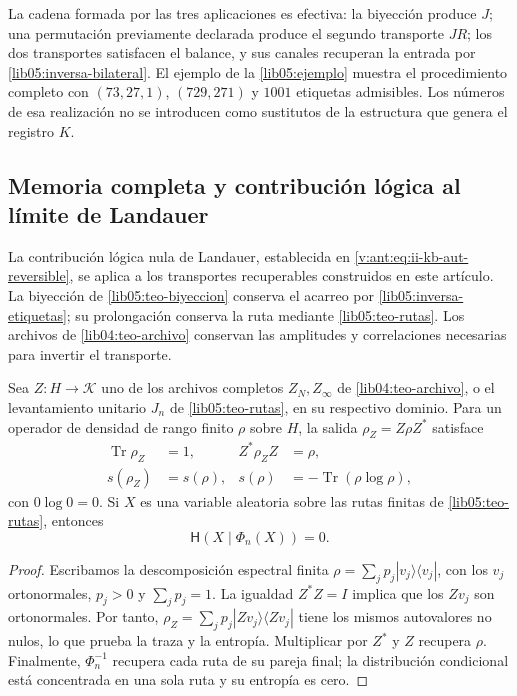 La cadena formada por las tres aplicaciones es efectiva: la biyección
produce \(J\); una permutación previamente declarada produce el
segundo transporte \(JR\); los dos transportes satisfacen el
balance, y sus canales recuperan la entrada por
\eqref{lib05:inversa-bilateral}. El ejemplo de la
\cref{lib05:ejemplo} muestra el procedimiento completo con
\((73,27,1)\), \((729,271)\) y \(1001\) etiquetas admisibles.
Los números de esa realización no se introducen como sustitutos de
la estructura que genera el registro \(K\).

\subsection{Memoria completa y contribución lógica al límite de Landauer}
\label{landauer:puente-archivo}

La contribución lógica nula de Landauer, establecida en
\eqref{v:ant:eq:ii-kb-aut-reversible}, se aplica a los transportes
recuperables construidos en este artículo. La biyección de
\cref{lib05:teo-biyeccion} conserva el acarreo por
\eqref{lib05:inversa-etiquetas}; su prolongación conserva la ruta
mediante \cref{lib05:teo-rutas}. Los archivos de
\cref{lib04:teo-archivo} conservan las amplitudes y correlaciones
necesarias para invertir el transporte.

\begin{corollary}
\label{landauer:cor-archivo}
Sea \(Z:H\to\mathcal K\) uno de los archivos completos
\(Z_N,Z_\infty\) de \cref{lib04:teo-archivo}, o el levantamiento
unitario \(J_n\) de \cref{lib05:teo-rutas}, en su respectivo dominio.
Para un operador de densidad de rango finito \(\rho\) sobre \(H\),
la salida \(\rho_Z=Z\rho Z^*\) satisface
\begin{align}
 \operatorname{Tr}\rho_Z&=1,& Z^*\rho_ZZ&=\rho,\\
 s(\rho_Z)&=s(\rho),&
 s(\rho)&=-\operatorname{Tr}(\rho\log\rho),
 \label{landauer:espectro}
\end{align}
con \(0\log0=0\). Si \(X\) es una variable aleatoria sobre las rutas
finitas de \cref{lib05:teo-rutas}, entonces
\begin{equation}
 \mathsf H(X\mid\Phi_n(X))=0.
 \label{landauer:recuperacion-ruta}
\end{equation}
\end{corollary}
\begin{proof}
Escribamos la descomposición espectral finita
\(\rho=\sum_jp_j|v_j\rangle\langle v_j|\), con los \(v_j\)
ortonormales, \(p_j>0\) y \(\sum_jp_j=1\). La igualdad
\(Z^*Z=I\) implica que los \(Zv_j\) son ortonormales. Por tanto,
\(\rho_Z=\sum_jp_j|Zv_j\rangle\langle Zv_j|\) tiene los mismos
autovalores no nulos, lo que prueba la traza y la entropía.
Multiplicar por \(Z^*\) y \(Z\) recupera \(\rho\). Finalmente,
\(\Phi_n^{-1}\) recupera cada ruta de su pareja final; la
distribución condicional está concentrada en una sola ruta y su
entropía es cero.
\end{proof}

